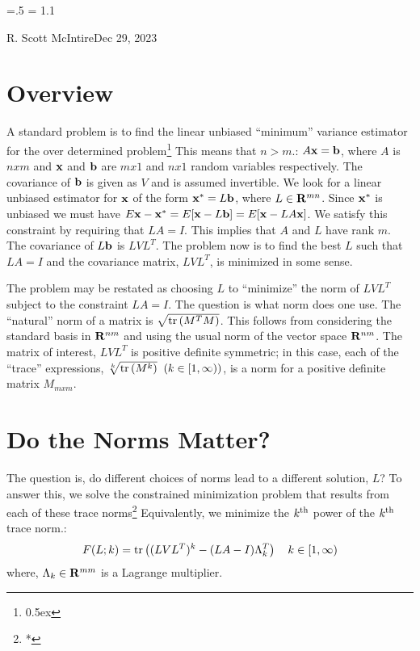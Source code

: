 

\parindent=0pt
\parskip=.5\baselineskip
\baselineskip = 1.1\baselineskip

{R. Scott McIntire}{Dec 29, 2023}

\section{Overview}
A standard problem is to find the linear unbiased ``minimum'' variance estimator
for the over determined problem\footnote{\kern 0.5pt \raise 0.5ex \hbox{\dag}}
{This means that $n > m$.}: $A {\bf x} = {\bf b}$, where 
$A$ is $nxm$ and ${\bf x}$ and
${\bf b}$ are $mx1$ and $nx1$ random variables respectively. The
covariance of ${\bf b}$ is given as $V$ and is assumed invertible. 
We look for a linear unbiased estimator for ${\bf x}$ of the form 
${\bf x}^* = L {\bf b}$, where $L\in {\bf R}^{mn}$. Since ${\bf x}^*$
is unbiased we must have 
$E{{\bf x} - {\bf x}^*} = E[{\bf x} - L
  {\bf b}] = E[{\bf x} - LA{\bf x}]$. We satisfy this constraint by
requiring that $LA = I$. This implies that $A$ and $L$ have rank $m$.
The covariance of $L{\bf b}$ is $LVL^T$. The problem now is to find
the best $L$ such that $LA = I$ and the covariance matrix, $LVL^T$, is
minimized in some sense.

The problem may be restated as choosing $L$ to ``minimize'' the norm of $LVL^T$
subject to the constraint $LA = I$. The question is what norm does one
use. The ``natural'' norm of a matrix is $\sqrt{{\rm
    tr}\left(M^TM\right)}$. This 
    follows from considering the standard basis in ${\bf R}^{nm}$ and
    using the usual norm of the vector space ${\bf R}^{nm}$. 
The matrix of interest, $LVL^T$ is positive definite
    symmetric; in this case, each of the ``trace'' 
expressions, $\root k \of {{\rm
          tr}\left(M^k\right)} \;\; (k \in [1,\infty ))$, is a norm for a 
positive definite matrix $M_{mxm}$.

\section{Do the Norms Matter?}
The question is, do different choices of norms lead to a different
solution, $L$? To answer this, we solve the constrained minimization 
problem that results from each of these trace norms\footnote{\kern 0.5pt *}
{Equivalently, we minimize the $k^{\rm th}$ power
of the $k^{\rm th}$ trace norm.}:
$$
F(L; k) = {\rm tr}\left((LVL^T)^k - (LA - I)\Lambda_{k}^T\right) 
\quad k \in [1,\infty)
$$
where, $\Lambda_k \in {\bf R}^{mm}$ is a Lagrange multiplier.

